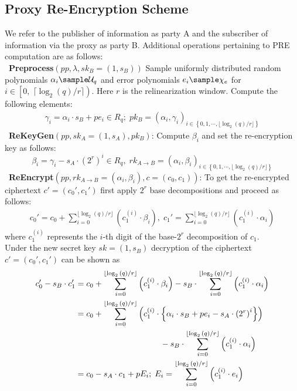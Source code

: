 \subsection{Proxy Re-Encryption Scheme}

We refer to the publisher of information as party A and the subscriber of information via the proxy as party B. Additional operations pertaining to PRE computation are as follows:\\

\noindent \textbullet\ \textbf{Preprocess}$\left(pp,\lambda, sk_B = \left(1,s_B \right) \right)$ Sample uniformly distributed random polynomials $\alpha_i \sample \mathcal{U}_q$ and error polynomials $e_i \sample \chi_e$ for $i \in \left[0, \; \lceil \log_2(q)/r\rceil \right)$. Here $r$ is the relinearization window. Compute the following elements:
\begin{align*}
\gamma_i = \alpha_i\cdot s_B + pe_i \in R_q;  \; pk_B = \left( \alpha_i, \gamma_i \right)_{i \in \left\{0,1,\cdots, \lfloor \log_2(q)/r\rfloor  \right\}}
\end{align*}
\noindent \textbullet\ \textbf{ReKeyGen}$\left(pp, sk_A = \left(1,s_A\right), pk_B\right)$: Compute $\beta_i$ and set the re-encryption key as follows:
$$\beta_i = \gamma_i - s_A\cdot (2^r)^i \in R_q, \; rk_{A\rightarrow B} = \left( \alpha_i, \beta_i \right)_{i \in \left\{0,1,\cdots, \lfloor \log_2(q)/r\rfloor  \right\}}$$
\noindent \textbullet\ \textbf{ReEncrypt}$\left(pp, rk_{A\rightarrow B} = \left(\alpha_i,\beta_i\right), c = \left(c_0,c_1 \right) \right)$: To get the re-encrypted ciphertext $c' = \left(c_0',c_1' \right)$ first apply $2^r$ base decompositions and proceed as follows:
\begin{align*}
c_0' = c_0 + \sum_{i=0}^{\lfloor \log_2{(q)}/r \rfloor} \left( c_1^{\left(i \right)} \cdot \beta_i \right) , \; c_1' = \sum_{i=0}^{\lfloor \log_2{(q)}/r \rfloor} \left( c_1^{\left(i \right)} \cdot \alpha_i \right)
\end{align*}
where $c_1^{\left( i \right)}$ represents the $i$-th digit of the base-$2^r$ decomposition of $c_1$.\\


Under the new secret key $sk = \left(1, s_B\right)$ decryption of the ciphertext $c' = \left(c_0',c_1'\right)$ can be shown as
\begin{align*}
c_0' - s_B\cdot c_1' & = c_0 + \sum_{i=0}^{\lfloor \log_2{(q)}/r \rfloor} \left( c_1^{\left(i \right)} \cdot \beta_i \right) - s_B \cdot \sum_{i=0}^{\lfloor \log_2{(q)}/r \rfloor} \left( c_1^{\left(i \right)} \cdot \alpha_i \right) \\
& = c_0 + \sum_{i=0}^{\lfloor \log_2{(q)}/r \rfloor}\left( c_1^{\left(i \right)} \cdot \left\{ \alpha_i\cdot s_B + pe_i - s_A\cdot \left(2^r \right)^i \right\} \right) \\ 
  &  \hskip 0.3\linewidth - s_B\cdot \sum_{i=0}^{\lfloor \log_2{(q)}/r \rfloor} \left( c_1^{\left(i \right)} \cdot \alpha_i \right) \\
& = c_0 - s_A\cdot c_1 + pE_i; \; E_i = \sum_{i=0}^{\lfloor \log_2{(q)}/r \rfloor} \left( c_1^{\left( i \right)} \cdot e_i \right) 
\end{align*}

